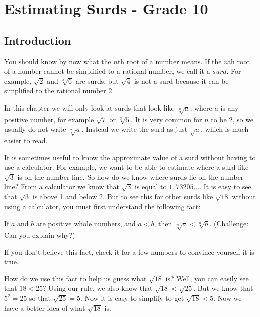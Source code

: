 \documentclass[10pt,a4paper,titlepage,twoside,openright]{report}
\begin{document}
\chapter{Estimating Surds - Grade 10}
\label{m:n:s:10}

\section{Introduction}


You should know by now what the $n$th root of a number means. If the $n$th root of a number cannot be simplified to a rational number, we call it a $\textit{surd}$. For example, $\sqrt{2}$ and $\sqrt[3]{6}$ are surds, but $\sqrt{4}$ is not a surd because it can be simplified to the rational number 2. 

In this chapter we will only look at surds that look like $\sqrt[n]{a}$, where $a$ is any positive number, for example $\sqrt{7}$ or $\sqrt[3]{5}$. It is very common for $n$ to be $2$, so we usually do not write $\sqrt[2]{a}$. Instead we write the surd as just $\sqrt{a}$, which is much easier to read.

It is sometimes useful to know the approximate value of a surd without having to use a calculator. For example, we want to be able to estimate where a surd like $\sqrt{3}$ is on the number line. So how do we know where surds lie on the number line? From a calculator we know that $\sqrt{3}$ is equal to $1,73205...$. It is easy to see that $\sqrt{3}$ is above 1 and below 2. But to see this for other surds like $\sqrt{18}$ without using a calculator, you must first understand the following fact:

\begin{IFact}{
If $a$ and $b$ are positive whole numbers, and $a < b$, then $\sqrt[n]{a} < \sqrt[n]{b}$. (Challenge: Can you explain why?) 
}\end{IFact}

If you don't believe this fact, check it for a few numbers to convince yourself it is true.

How do we use this fact to help us guess what $\sqrt{18}$ is? Well, you can easily see that $18 < 25$? Using our rule, we also know that $\sqrt{18} < \sqrt{25}$. But we know that $5^2 = 25$ so that $\sqrt{25} = 5$. Now it is easy to simplify to get $\sqrt{18} < 5$. Now we have a better idea of what $\sqrt{18}$ is. 
\end{document}
